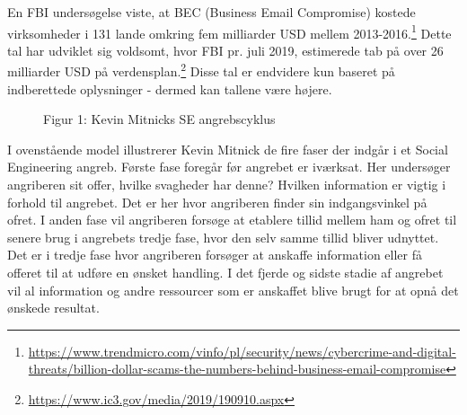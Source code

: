 \documentclass[11pt]{report}
\begin{document}
En FBI undersøgelse viste, at BEC (Business Email Compromise) kostede virksomheder i 131 lande omkring fem milliarder USD mellem 2013-2016.\footnote{\url{https://www.trendmicro.com/vinfo/pl/security/news/cybercrime-and-digital-threats/billion-dollar-scams-the-numbers-behind-business-email-compromise}} Dette tal har udviklet sig voldsomt, hvor FBI pr. juli 2019, estimerede tab på over 26 milliarder USD på verdensplan.\footnote{\url{https://www.ic3.gov/media/2019/190910.aspx}}  Disse tal er endvidere kun baseret på indberettede oplysninger - dermed kan tallene være højere.
\begin{figure}[H]
  \caption*{Figur 1: Kevin Mitnicks SE angrebscyklus }
\end{figure}


I ovenstående model illustrerer Kevin Mitnick de fire faser der indgår i et Social Engineering angreb. Første fase foregår før angrebet er iværksat. Her undersøger angriberen sit offer, hvilke svagheder har denne? Hvilken information er vigtig i forhold til angrebet. Det er her hvor angriberen finder sin indgangsvinkel på ofret.
I anden fase vil angriberen forsøge at etablere tillid mellem ham og ofret til senere brug i angrebets tredje fase, hvor den selv samme tillid bliver udnyttet. 
Det er i tredje fase hvor angriberen forsøger at anskaffe information eller få offeret til at udføre en ønsket handling. 
I det fjerde og sidste stadie af angrebet vil al information og andre ressourcer som er anskaffet blive brugt for at opnå det ønskede resultat.
\end{document}
